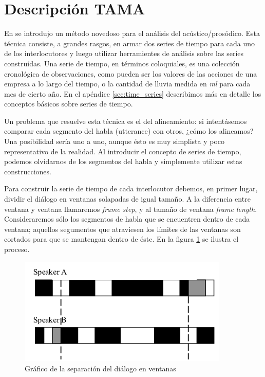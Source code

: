 \section{Descripción TAMA}

En \cite{KOU2008} se introdujo un método novedoso para el análisis del \entrainment acústico/prosódico. Esta técnica consiste, a grandes rasgos, en armar dos series de tiempo para cada uno de los interlocutores y luego utilizar herramientes de análisis sobre las series construídas. Una serie de tiempo, en términos coloquiales, es una colección cronológica de observaciones, como pueden ser los valores de las acciones de una empresa a lo largo del tiempo, o la cantidad de lluvia medida en \emph{ml} para cada mes de cierto año. En el apéndice \ref{sec:time_series} describimos más en detalle los conceptos básicos sobre series de tiempo.

Un problema que resuelve esta técnica es el del alineamiento: si intentásemos comparar cada segmento del habla (utterance) con otros, ¿cómo los alineamos? Una posibilidad sería uno a uno, aunque ésto es muy simplista y poco representativo de la realidad. Al introducir el concepto de series de tiempo, podemos olvidarnos de los segmentos del habla y simplemente utilizar estas construcciones.

Para construir la serie de tiempo de cada interlocutor debemos, en primer lugar, dividir el diálogo en ventanas solapadas de igual tamaño. A la diferencia entre ventana y ventana llamaremos \emph{frame step}, y al tamaño de ventana \emph{frame length}. Consideraremos sólo los segmentos de habla que se encuentren dentro de cada ventana; aquellos segumentos que atraviesen los límites de las ventanas son cortados para que se mantengan dentro de éste. En la figura \ref{tama} se ilustra el proceso.

\begin{figure}
\centering
\includegraphics[width=10cm]{images/tama.png}
\caption{Gráfico de la separación del diálogo en ventanas}
\label{tama}
\end{figure}

